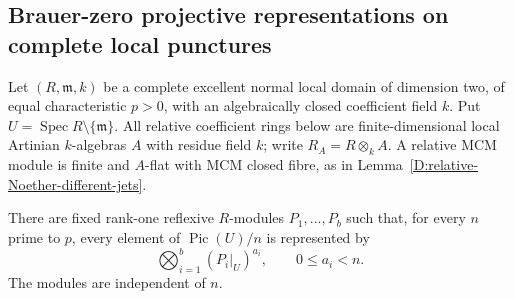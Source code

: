 \subsection{Brauer-zero projective representations on complete local punctures}

Let $(R,\mathfrak m,k)$ be a complete excellent normal local domain
of dimension two, of equal characteristic $p>0$, with an
algebraically closed coefficient field $k$.  Put
$U=\operatorname{Spec}R\setminus\{\mathfrak m\}$.
All relative coefficient rings below are finite-dimensional local
Artinian $k$-algebras $A$ with residue field $k$; write
$R_A=R\otimes_kA$.  A relative MCM module is finite and $A$-flat
with MCM closed fibre, as in
Lemma~\ref{D:relative-Noether-different-jets}.

\begin{lemma}
\label{D:local-Picard-prime-to-p-generators}
There are fixed rank-one reflexive $R$-modules $P_1,\ldots,P_b$
such that, for every $n$ prime to $p$, every element of
$\operatorname{Pic}(U)/n$ is represented by
\[
                \bigotimes_{i=1}^b(P_i|_U)^{a_i},
                         \qquad 0\le a_i<n.             \tag{D.LBZ.1}
\]
The modules are independent of $n$.
\end{lemma}

